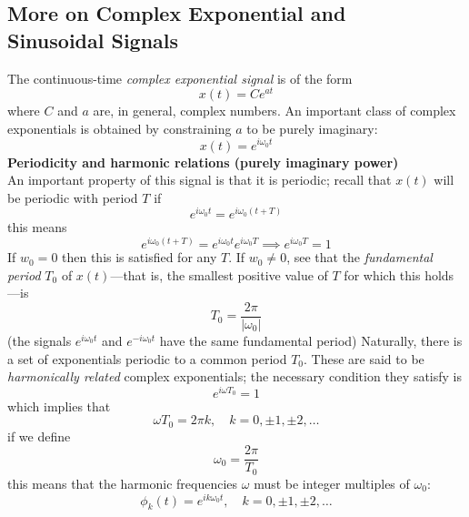 \documentclass{report}
\begin{document}
\subsection{More on Complex Exponential and\\Sinusoidal Signals}
The continuous-time \textit{complex exponential signal} is of the form
\begin{equation*}
x(t)=Ce^{at}
\end{equation*}
where $C$ and $a$ are, in general, complex numbers. An important class of complex exponentials is obtained by constraining $a$ to be purely imaginary:
\begin{equation*}
x(t)=e^{i\omega_0t}
\end{equation*}
\textbf{Periodicity and harmonic relations (purely imaginary power)}\\
An important property of this signal is that it is periodic; recall that $x(t)$ will be periodic with period $T$ if
\begin{equation*}
e^{i\omega_0t}=e^{i\omega_0(t+T)}
\end{equation*}
this means
\begin{equation*}
e^{i\omega_0(t+T)}=e^{i\omega_0t}e^{i\omega_0T}\implies
e^{i\omega_0T}=1
\end{equation*}
If $w_0=0$ then this is satisfied for any $T$. If $w_0\neq0$, see that the \textit{fundamental period} 
$T_0$ of $x(t)$---that is, the smallest positive value of $T$ for which this holds---is
\begin{equation*}
T_0=\frac{2\pi}{|\omega_0|}
\end{equation*}
(the signals $e^{i\omega_0t}$ and $e^{-i\omega_0t}$ have the same fundamental period)
Naturally, there is a set of exponentials periodic to a common period $T_0$. These are said to be
\textit{harmonically related} complex exponentials; the necessary condition they satisfy is
\begin{equation*}
e^{i\omega T_0}=1
\end{equation*}
which implies that
\begin{equation*}
\omega T_0=2\pi k,\quad k=0,\pm1,\pm2,\ldots
\end{equation*}
if we define 
\begin{equation*}
\omega_0=\frac{2\pi}{T_0}
\end{equation*}
this means that the harmonic frequencies $\omega$ must be integer multiples of $\omega_0$:
\begin{equation*}
\phi_k(t)=e^{ik\omega_0t},\quad k=0,\pm1,\pm2,\ldots
\end{equation*}
\end{document}
